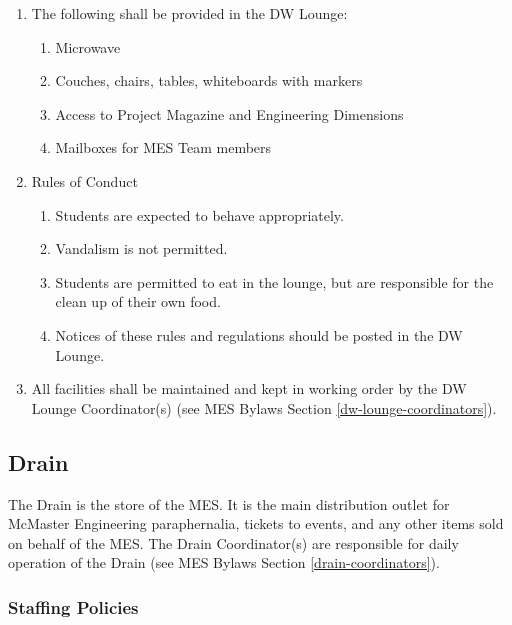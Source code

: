 \begin{enumerate}
 \item
  The following shall be provided in the DW Lounge:

  \begin{enumerate}
   \item
    Microwave
   \item
    Couches, chairs, tables, whiteboards with markers
   \item
    Access to Project Magazine and Engineering Dimensions
   \item
    Mailboxes for MES Team members
  \end{enumerate}
 \item
  Rules of Conduct

  \begin{enumerate}
   \item
    Students are expected to behave appropriately.
   \item
    Vandalism is not permitted.
   \item
    Students are permitted to eat in the lounge, but are responsible for the clean up of their own food.
   \item
    Notices of these rules and regulations should be posted in the DW Lounge.
  \end{enumerate}
 \item
  All facilities shall be maintained and kept in working order by the DW Lounge Coordinator(s) (see MES Bylaws Section \ref{dw-lounge-coordinators}).
\end{enumerate}
\subsection{Drain}
\label{drain}

The Drain is the store of the MES. It is the main distribution outlet for McMaster Engineering paraphernalia, tickets to events, and any other items sold on behalf of the MES. The Drain Coordinator(s) are responsible for daily operation of the Drain (see MES Bylaws Section \ref{drain-coordinators}).

\subsubsection{Staffing Policies}
\label{staffing-policies}

